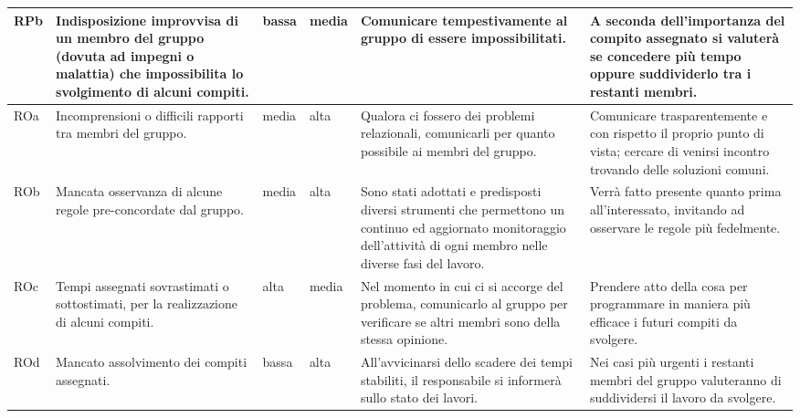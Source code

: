 {\begin{longtable}{|p{1cm}|p{3cm}|p{1cm}|p{1cm}|p{3cm}|p{3cm}|}
        \hline
        RPb &
        Indisposizione improvvisa di un membro del gruppo (dovuta ad impegni o malattia) che impossibilita lo svolgimento di alcuni compiti. &
        bassa &
        media &
        Comunicare tempestivamente al gruppo di essere impossibilitati. &
        A seconda dell'importanza del compito assegnato si valuterà se concedere più tempo oppure suddividerlo tra i restanti membri. \\
        \hline
        ROa &
        Incomprensioni o difficili rapporti tra membri del gruppo. &
        media &
        alta &
        Qualora ci fossero dei problemi relazionali, comunicarli per quanto possibile ai membri del gruppo. &
        Comunicare trasparentemente e con rispetto il proprio punto di vista; cercare di venirsi incontro trovando delle soluzioni comuni. \\
        \hline
        ROb &
        Mancata osservanza di alcune regole pre-concordate dal gruppo. &
        media &
        alta &
        Sono stati adottati e predisposti diversi strumenti che permettono un continuo ed aggiornato monitoraggio dell'attività di ogni membro nelle diverse fasi del lavoro. &
        Verrà fatto presente quanto prima all'interessato, invitando ad osservare le regole più fedelmente. \\
        \hline
        ROc &
        Tempi assegnati sovrastimati o sottostimati, per la realizzazione di alcuni compiti. &
        alta &
        media &
        Nel momento in cui ci si accorge del problema, comunicarlo al gruppo per verificare se altri membri sono della stessa opinione. &
        Prendere atto della cosa per programmare in maniera più efficace i futuri compiti da svolgere. \\
        \hline
        ROd &
        Mancato assolvimento dei compiti assegnati. &
        bassa &
        alta &
        All'avvicinarsi dello scadere dei tempi stabiliti, il responsabile si informerà sullo stato dei lavori. &
        Nei casi più urgenti i restanti membri del gruppo valuteranno di suddividersi il lavoro da svolgere. \\
        \hline
    
        \end{longtable}
    }